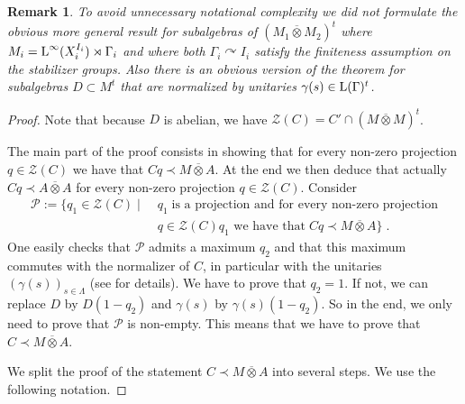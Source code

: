 \documentclass[a4paper,11pt]{amsart}
\numberwithin{equation}{section}
\newtheorem{remark}[definition]{Remark}
\begin{document}
\begin{remark}
To avoid unnecessary notational complexity we did not formulate the obvious more general result for subalgebras of $(M_1 {\mathbin{\overline{\otimes}}} M_2)^t$ where $M_i = {\mathord{\text{\rm L}}}^\infty(X_i^{I_i}) \rtimes \Gamma_i$ and where both $\Gamma_i {\curvearrowright} I_i$ satisfy the finiteness assumption on the stabilizer groups. Also there is an obvious version of the theorem for subalgebras $D \subset M^t$ that are normalized by unitaries $\gamma(s) \in {\mathord{\text{\rm L}}}(\Gamma)^t$.
\end{remark}

\begin{proof}
Note that because $D$ is abelian, we have ${\mathcal{Z}}(C) = C' \cap (M {\mathbin{\overline{\otimes}}} M)^t$.

The main part of the proof consists in showing that for every non-zero projection $q \in {\mathcal{Z}}(C)$ we have that $C q \prec M {\mathbin{\overline{\otimes}}} A$. At the end we then deduce that actually $C q \prec A {\mathbin{\overline{\otimes}}} A$ for every non-zero projection $q \in {\mathcal{Z}}(C)$. Consider
\begin{align*}
{\mathcal{P}} := \{q_1 \in {\mathcal{Z}}(C) \mid \; & q_1 \;\text{is a projection and for every non-zero projection} \\ &\text{$q \in {\mathcal{Z}}(C) q_1$ we have that}\; C q \prec M {\mathbin{\overline{\otimes}}} A \} \; .
\end{align*}
One easily checks that ${\mathcal{P}}$ admits a maximum $q_2$ and that this maximum commutes with the normalizer of $C$, in particular with the unitaries $(\gamma(s))_{s \in \Lambda}$ (see \cite[Proposition 2.5]{Va10} for details). We have to prove that $q_2 = 1$. If not, we can replace $D$ by $D(1-q_2)$ and $\gamma(s)$ by $\gamma(s) (1-q_2)$. So in the end, we only need to prove that ${\mathcal{P}}$ is non-empty. This means that we have to prove that $C \prec M {\mathbin{\overline{\otimes}}} A$.

We split the proof of the statement $C \prec M {\mathbin{\overline{\otimes}}} A$ into several steps. We use the following notation.


\end{proof}
\end{document}
